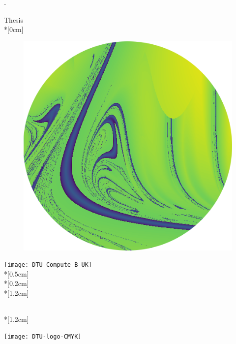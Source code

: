 \thispagestyle{empty}             %
\calccentering{\unitlength}
\begin{adjustwidth*}{\unitlength}{-\unitlength}
    \begin{adjustwidth}{-0.5cm}{-0.5cm}
        \sffamily
        \begin{flushright}
            \thesistypeabbr{} Thesis\\*[0cm]
            \thesistype{}\\
        \end{flushright}
        \vspace{0.1cm}
            \begin{figure}[ht!]
                \centering
                \includegraphics[scale=0.45]{fig/title.png}
                \caption*{}
                \makeatletter
            \end{figure}
        \vspace{0.2cm}
        \noindent
        \texttt{[image: DTU-Compute-B-UK]}\\*[0.5cm]
        \HUGE \thesistitle{}\\*[0.2cm]
        \Huge \thesissubtitle{}\\*[1.2cm]
        \parbox[b]{0.5\linewidth}{%
            \LARGE 
            \thesisauthor{}\\*[1.2cm]
            \Large
            \thesislocation{} \the\year
        }
        \hfill\texttt{[image: DTU-logo-CMYK]}
    \end{adjustwidth}
\end{adjustwidth*}
\normalfont
\normalsize
